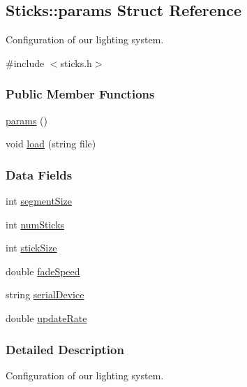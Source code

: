 \hypertarget{structSticks_1_1params}{\subsection{\-Sticks\-:\-:params \-Struct \-Reference}
\label{structSticks_1_1params}
}


\-Configuration of our lighting system.  




{\ttfamily \#include $<$sticks.\-h$>$}

\subsubsection*{\-Public \-Member \-Functions}
\begin{DoxyCompactItemize}
\item 
\hyperlink{structSticks_1_1params_a8adcd5bb24e5607eb8b83f68c2ab8097}{params} ()
\item 
void \hyperlink{structSticks_1_1params_aae9aa072798ef74e013a013d3024354b}{load} (string file)
\end{DoxyCompactItemize}
\subsubsection*{\-Data \-Fields}
\begin{DoxyCompactItemize}
\item 
int \hyperlink{structSticks_1_1params_afee40c35f7621dcba02ae755f7db0292}{segment\-Size}
\item 
int \hyperlink{structSticks_1_1params_af9e0e65fa19555f79375dab3fbd27dfc}{num\-Sticks}
\item 
int \hyperlink{structSticks_1_1params_aae2d05386b06e6faf82759a12b0bdc4c}{stick\-Size}
\item 
double \hyperlink{structSticks_1_1params_a4946830874bad4b347a425afa8440375}{fade\-Speed}
\item 
string \hyperlink{structSticks_1_1params_a325436522335899ab53093554dc4a48b}{serial\-Device}
\item 
double \hyperlink{structSticks_1_1params_a2b70eb4c47c0e08cd08c82c0166bdf72}{update\-Rate}
\end{DoxyCompactItemize}


\subsubsection{\-Detailed \-Description}
\-Configuration of our lighting system. 

